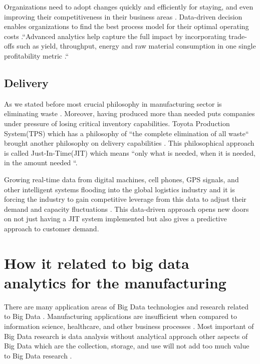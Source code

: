\documentclass[sigconf]{acmart}
\begin{document}
Organizations need to adopt changes quickly and efficiently for staying, and even improving their competitiveness in their business areas \cite{HAMMER2017715}. Data-driven decision enables organizations to find the best process model for their optimal operating costs \cite{HAMMER2017715}.``Advanced analytics help capture the full impact by incorporating trade-offs such as yield, throughput, energy and raw material consumption in one single profitability metric \cite{HAMMER2017715}.``

\subsection{Delivery}
As we stated before most crucial philosophy in manufacturing sector is eliminating waste \cite{www-toyota}. Moreover, having produced more than needed puts companies under pressure of losing critical inventory capabilities. Toyota Production System(TPS) which has a philosophy of ``the complete elimination of all waste`` brought another philosophy on delivery capabilities \cite{www-toyota}. This philosophical approach is called Just-In-Time(JIT) which means ``only what is needed, when it is needed, in the amount needed \cite{www-toyota}``.

Growing real-time data from digital machines, cell phones, GPS signals, and other intelligent systems flooding into the global logistics industry and it is forcing the industry to gain competitive leverage from this data to adjust their demand and capacity fluctuations \cite{ZHONG2016572}. This data-driven approach opens new doors on not just having a JIT system implemented but also gives a predictive approach to customer demand. 


\section{How it related to big data analytics for the manufacturing}

There are many application areas of Big Data technologies and research related to Big Data \cite{BABICEANU2016128}. Manufacturing applications are insufficient when compared to information science, healthcare, and other business processes \cite{BABICEANU2016128}. Most important of Big Data research is data analysis without analytical approach other aspects of Big Data which are the collection, storage, and use will not add too much value to Big Data research \cite{BABICEANU2016128}. 
\end{document}
